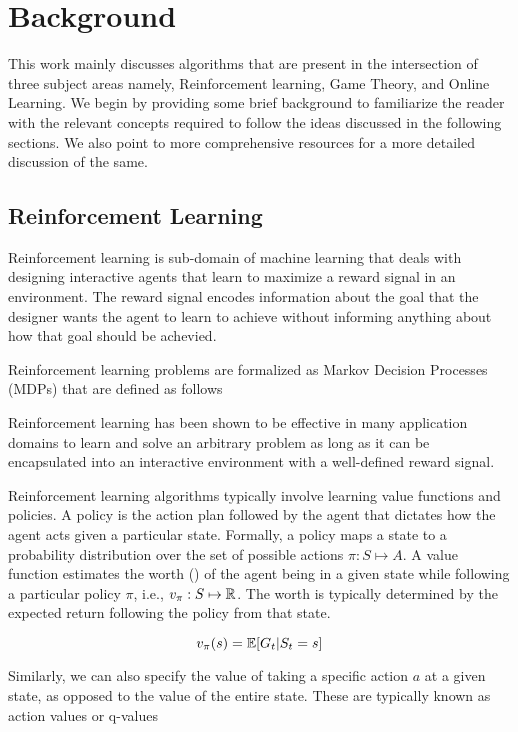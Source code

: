 \chapter{Background}

This work mainly discusses algorithms that are present in the intersection of three subject areas
namely, Reinforcement learning, Game Theory, and Online Learning.
We begin by providing some brief background to familiarize the reader with the relevant concepts
required to follow the ideas discussed in the following sections.
We also point to more comprehensive resources for a more detailed discussion of the same.

\section{Reinforcement
  Learning}

Reinforcement learning is sub-domain of machine learning that deals with designing interactive
agents that learn to maximize a reward signal in an environment.
The reward signal encodes information about the goal that the designer wants the agent to learn to
achieve without informing anything about how that goal should be achevied.

Reinforcement learning problems are formalized as Markov Decision Processes (MDPs) that are defined
as follows 

Reinforcement learning has been shown to be
effective in many application domains to learn and solve an arbitrary problem as long as it can be
encapsulated into an interactive environment with a well-defined reward signal.

Reinforcement learning algorithms typically involve learning value functions and policies.
A policy is the action plan followed by the agent that dictates how the agent acts given a
particular state.
Formally, a policy maps a state to a probability distribution over the set of possible actions
$\pi: S \mapsto A$.
A value function estimates the worth () of the agent being in a given state while following
a particular policy $\pi$, i.e., $v_{\pi}: S \mapsto \mathbb{R}$.
The worth is typically determined by the expected return following the policy from that state.

$$ v_{\pi}(s) = \mathbb{E}[G_t | S_t = s]$$

Similarly, we can also specify the value of taking a specific action $a$ at a given state, as
opposed to the value of the entire state.
These are typically known as action values or q-values

